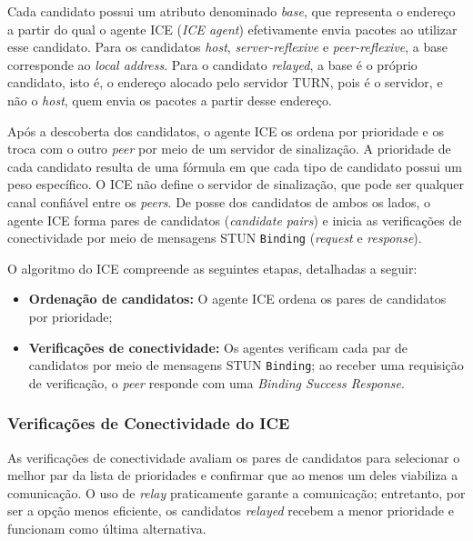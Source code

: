 Cada candidato possui um atributo denominado \textit{base}, que representa o endereço a partir do qual o agente ICE (\textit{ICE agent}) efetivamente envia pacotes ao utilizar esse candidato. Para os candidatos \textit{host}, \textit{server-reflexive} e \textit{peer-reflexive}, a base corresponde ao \textit{local address}. Para o candidato \textit{relayed}, a base é o próprio candidato, isto é, o endereço alocado pelo servidor TURN, pois é o servidor, e não o \textit{host}, quem envia os pacotes a partir desse endereço.

Após a descoberta dos candidatos, o agente ICE os ordena por prioridade e os troca com o outro \textit{peer} por meio de um servidor de sinalização. A prioridade de cada candidato resulta de uma fórmula em que cada tipo de candidato possui um peso específico. O ICE não define o servidor de sinalização, que pode ser qualquer canal confiável entre os \textit{peers}. De posse dos candidatos de ambos os lados, o agente ICE forma pares de candidatos (\textit{candidate pairs}) e inicia as verificações de conectividade por meio de mensagens STUN \texttt{Binding} (\textit{request} e \textit{response}).

O algoritmo do ICE compreende as seguintes etapas, detalhadas a seguir:

\begin{itemize}
    \item \textbf{Ordenação de candidatos:} O agente ICE ordena os pares de candidatos por prioridade;
    \item \textbf{Verificações de conectividade:} Os agentes verificam cada par de candidatos por meio de mensagens STUN \texttt{Binding}; ao receber uma requisição de verificação, o \textit{peer} responde com uma \textit{Binding Success Response}.
\end{itemize}

\subsubsection{Verificações de Conectividade do ICE}
\label{sec:ice_connectivity_checks}

As verificações de conectividade avaliam os pares de candidatos para selecionar o melhor par da lista de prioridades e confirmar que ao menos um deles viabiliza a comunicação. O uso de \textit{relay} praticamente garante a comunicação; entretanto, por ser a opção menos eficiente, os candidatos \textit{relayed} recebem a menor prioridade e funcionam como última alternativa.


